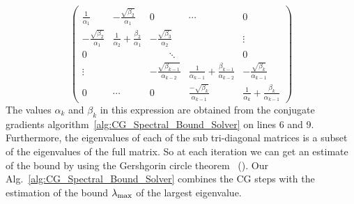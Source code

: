 \begin{equation}\label{eq:tridiag}
    \left(
    \begin{array}{ccccc}
      \frac{1}{\alpha_1} & - \frac{\sqrt{\beta_2}}{\alpha_1}  & 0 & \cdots & 0 \\
      - \frac{\sqrt{\beta_2}}{\alpha_1} & \frac{1}{\alpha_2} + \frac{\beta_2}{\alpha_1} & - \frac{\sqrt{\beta_3}}{\alpha_2} & & \vdots \\
0 &  & \quad\quad\ddots &  & 0 \\
      \vdots &  &-\frac{\sqrt{\beta_{k-1}}}{\alpha_{k-2}} & \frac{1}{\alpha_{k-1}} + \frac{\beta_{k-1}}{\alpha_{k-2}}  & -\frac{\sqrt{\beta_k}}{\alpha_{k-1}} \\
               0 & \cdots & 0 &\frac{-\sqrt{\beta_k}}{\alpha_{k-1}} &  \frac{1}{\alpha_k} + \frac{\beta_k}{\alpha_{k-1}}
    \end{array}
    \right)
\end{equation}
The values $\alpha_k$ and $\beta_k$ in this expression are obtained
  from the conjugate gradients algorithm~\ref{alg:CG_Spectral_Bound_Solver} on lines 6 and 9. Furthermore,
the eigenvalues of each of the sub tri-diagonal matrices is a subset
of the eigenvalues of the full matrix. So at each iteration we can get
an estimate of the bound by using the Gershgorin circle theorem ~(\citet*{bell1965gershgorin}). Our Alg.~\ref{alg:CG_Spectral_Bound_Solver} combines the CG steps with the estimation of the bound $\lambda_{\rm max}$ of the largest eigenvalue.

